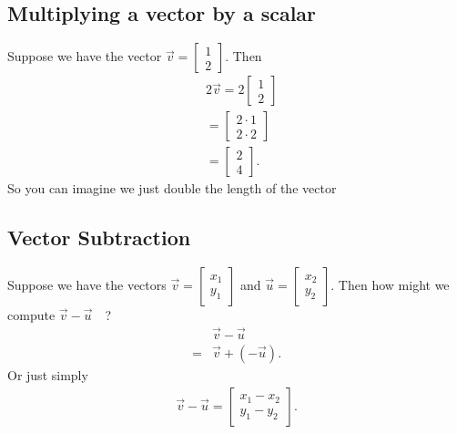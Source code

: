 \documentclass{report}
\begin{document}
    \bigbreak \noindent 
    \subsection{Multiplying a vector by a scalar}
    \bigbreak \noindent 
    Suppose we have the vector $ \vec{v} = \begin{bmatrix} 1 \\ 2 \end{bmatrix} $. Then
    \begin{align*}
        &2 \vec{v} = 2 \begin{bmatrix} 1 \\ 2 \end{bmatrix} \\
        &= \begin{bmatrix} 2 \cdot 1 \\ 2 \cdot 2 \end{bmatrix} \\
        &= \begin{bmatrix} 2 \\ 4 \end{bmatrix}
    .\end{align*}
    \bigbreak \noindent 
    So you can imagine we just double the length of the vector

    \pagebreak \bigbreak \noindent 
    \subsection{Vector Subtraction}
    \bigbreak \noindent 
    Suppose we have the vectors $ \vec{v} = \begin{bmatrix} x_{1} \\ y_{1}  \end{bmatrix} $ and $ \vec{u} = \begin{bmatrix} x_{2} \\ y_{2} \end{bmatrix} $. Then how might we compute $ \vec{v} - \vec{u}$\ \ ? 
    \begin{align*}
        &\vec{v} - \vec{u}  \\
        =&\vec{v}  + (-\vec{u})
    .\end{align*}
    \bigbreak \noindent 
    Or just simply
    \begin{align*}
        \vec{v} - \vec{u} = \begin{bmatrix} x_{1} - x_{2} \\ y_{1} - y_{2} \end{bmatrix}
    .\end{align*}
\end{document}
